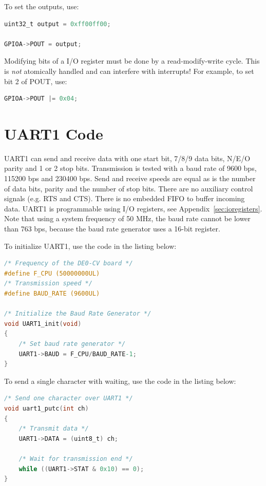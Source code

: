 \documentclass[12pt]{article}
\begin{document}
To set the outputs, use:

\begin{lstlisting}[language=C]
uint32_t output = 0xff00ff00;

GPIOA->POUT = output;
\end{lstlisting}

Modifying bits of a I/O register must be done by a read-modify-write cycle. This is \emph{not} atomically handled and can interfere with interrupts! For example, to set bit 2 of POUT, use:

\begin{lstlisting}[language=C]
GPIOA->POUT |= 0x04;
\end{lstlisting}

\section{UART1 Code}

UART1 can send and receive data with one start bit, 7/8/9 data bits, N/E/O parity and 1 or 2 stop bits. Transmission is tested with a baud rate of 9600 bps, 115200 bps and 230400 bps. Send and receive speeds are equal as is the number of data bits, parity and the number of stop bits. There are no auxiliary control signals (e.g. RTS and CTS). There is no embedded FIFO to buffer incoming data. UART1 is programmable using I/O registers, see Appendix~\ref{sec:ioregisters}. Note that using a system frequency of 50 MHz, the baud rate cannot be lower than 763 bps, because the baud rate generator uses a 16-bit register.

To initialize UART1, use the code in the listing below:

\begin{lstlisting}[language=C]
/* Frequency of the DE0-CV board */
#define F_CPU (50000000UL)
/* Transmission speed */
#define BAUD_RATE (9600UL)

/* Initialize the Baud Rate Generator */
void UART1_init(void)
{
    /* Set baud rate generator */
    UART1->BAUD = F_CPU/BAUD_RATE-1;
}
\end{lstlisting}

To send a single character with waiting, use the code in the listing below:

\begin{lstlisting}[language=C]
/* Send one character over UART1 */
void uart1_putc(int ch)
{
    /* Transmit data */
    UART1->DATA = (uint8_t) ch;
            
    /* Wait for transmission end */
    while ((UART1->STAT & 0x10) == 0);
}
\end{lstlisting}
\end{document}
